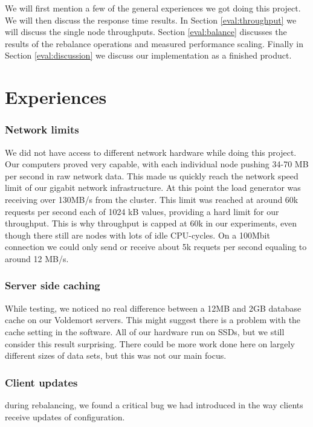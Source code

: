 
We will first mention a few of the general experiences we got doing this project.
We will then discuss the response time results. In Section \ref{eval:throughput} we will discuss the single node throughputs.
Section \ref{eval:balance} discusses the results of the rebalance operations and measured performance scaling. Finally in Section \ref{eval:discussion} we discuss our implementation as a finished product. 

\section{Experiences}
\subsubsection{Network limits}
We did not have access to different network hardware while doing this project. Our computers proved very capable, with each individual node pushing 34-70 MB per second in raw network data. This made us quickly reach the network speed limit of our gigabit network infrastructure. At this point the load generator was receiving over 130MB/s from the cluster. This limit was reached at around 60k requests per second each of 1024 kB values, providing a hard limit for our throughput. This is why throughput is capped at 60k in our experiments, even though there still are nodes with lots of idle CPU-cycles. On a 100Mbit connection we could only send or receive about 5k requets per second equaling to around 12 MB/s.

\subsubsection{Server side caching}
While testing, we noticed no real difference between a 12MB and 2GB database cache on our Voldemort servers. This might suggest there is a problem with the cache setting in the software. All of our hardware run on SSDs, but we still consider this result surprising. There could be more work done here on largely different sizes of data sets, but this was not our main focus.

\subsubsection{Client updates}
during rebalancing, we found a critical bug we had introduced in the way clients receive updates of configuration.

